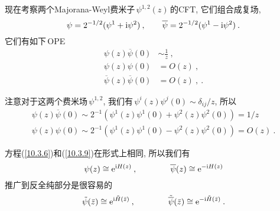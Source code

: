 现在考察两个Majorana-Weyl费米子$\,\psi^{1,2}(z)\,$的CFT, 它们组合成复场,
\begin{equation}
    \psi=2^{-1/2}(\psi^{1}+\mathrm{i}\psi^{2})\:, \qquad \overline{\psi}=2^{-1/2}(\psi^{1}-\mathrm{i}\psi^{2})\:.\label{10.3.8}
\end{equation}
它们有如下\,OPE
\begin{subequations}
\begin{align}
    \psi(z)\overline{\psi}(0)&\sim\frac{1}{z} \:, \label{10.3.9a} \\
    \psi(z)\psi(0) &= O(z) \:, \label{10.3.9b} \\
    \overline{\psi}(z)\overline{\psi}(0) &= O(z) \:, \label{10.3.9c}\:.
\end{align} \label{10.3.9}
\end{subequations}
\begin{tcolorbox}
注意对于这两个费米场$\,\psi^{1,2}$, 我们有$\,\psi^{i}(z)\psi^{j}(0)\sim \delta_{ij}/z$, 所以
\begin{gather*}
    \psi(z)\overline{\psi}(0) \sim 2^{-1} (\psi^{1}(z)\psi^{1}(0)+\psi^{2}(z)\psi^{2}(0)) = 1/z \\
    \psi(z)\psi(0) \sim 2^{-1} (\psi^{1}(z)\psi^{1}(0)-\psi^{2}(z)\psi^{2}(0)) = O(z) \:.
\end{gather*}
\end{tcolorbox}
方程(\ref{10.3.6})和(\ref{10.3.9})在形式上相同, 所以我们有
\begin{equation}
    \psi(z)\cong \mathrm{e}^{\mathrm{i} H(z)} \:, \qquad \qquad \overline{\psi}(z)\cong \mathrm{e}^{-\mathrm{i} H(z)} \label{10.3.10}
\end{equation}
推广到反全纯部分是很容易的
\begin{equation}
    \tilde{\psi}(\bar{z}) \cong \mathrm{e}^{\mathrm{i}\tilde{H}(\bar{z})} \:, \qquad \qquad
    \tilde{\overline{\psi}}(\bar{z})\cong \mathrm{e}^{-\mathrm{i}\tilde{H}(\bar{z})} \:. \label{10.3.11}
\end{equation}

